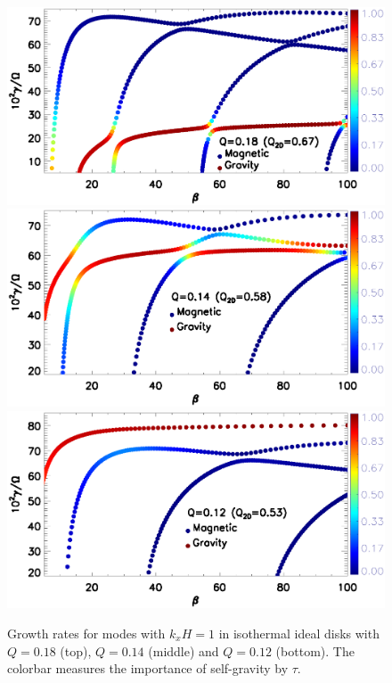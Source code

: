 \begin{figure}
  \includegraphics[width=\linewidth,clip=true,trim=0cm 2.1cm 0cm
    0cm]{figures/compare_growth3_kx1_Q0d18.ps} 
  \includegraphics[width=\linewidth,clip=true,trim=0cm 2.1cm 0cm
    0.5cm]{figures/compare_growth3_kx1_Q0d14.ps} 
  \includegraphics[width=\linewidth,clip=true,trim=0cm 0cm 0cm
    0.5cm]{figures/compare_growth3_kx1_Q0d12.ps} 
  \caption{Growth rates for modes with $k_xH=1$ in isothermal ideal
    disks with $Q=0.18$ (top), $Q=0.14$ (middle) and $Q=0.12$ (bottom). The
    colorbar measures the importance of  
    self-gravity by $\tau$.   
    \label{compare_growth3}}
\end{figure}

